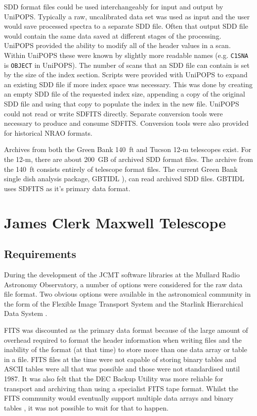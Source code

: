 \documentclass[final,authoryear,5p,times,twocolumn]{elsarticle}
\newcommand{\ascl}[1]{\href{http://www.ascl.net/#1}{ascl:#1}}
\begin{document}
SDD format files could be used interchangeably for input and output by
UniPOPS.  Typically a raw, uncalibrated data set was used as input and
the user would save processed spectra to a separate SDD file.  Often
that output SDD file would contain the same data saved at different
stages of the processing.  UniPOPS provided the ability to modify all
of the header values in a scan.  Within UniPOPS these were known by
slightly more readable names (e.g. \texttt{C1SNA} is \texttt{OBJECT}
in UniPOPS). The number of scans that an SDD file can contain is set
by the size of the index section.  Scripts were provided with UniPOPS
to expand an existing SDD file if more index space was necessary.
This was done by creating an empty SDD file of the requested index
size, appending a copy of the original SDD file and using that copy to
populate the index in the new file.  UniPOPS could not read or write
SDFITS directly. Separate conversion tools were necessary to produce
and consume SDFITS.  Conversion tools were also provided for
historical NRAO formats.

Archives from both the Green Bank 140\, ft and Tucson 12-m telescopes
exist.  For the 12-m, there are about 200\, GB of archived SDD format
files.  The archive from the 140\, ft consists entirely of telescope
format files.  The current Green Bank single dish analysis package,
GBTIDL \citep[][\ascl{1303.019}]{2006ASPC..351..512M}), can read
archived SDD files.  GBTIDL uses SDFITS as it's primary data format.

\section{James Clerk Maxwell Telescope}

\subsection{Requirements}

During the development of the JCMT software libraries at the Mullard
Radio Astronomy Observatory, a number of options were considered for
the raw data file format.  Two obvious options were available in the
astronomical community in the form of the Flexible Image Transport System
\citep[FITS;][]{1981A&AS...44..363W} and the Starlink Hierarchical
Data System \citep[HDS;][\ascl{1502.009}]{1982QJRAS..23..485D,2015HDS}.

FITS was discounted as the primary data format because of the large
amount of overhead required to format the header information when
writing files and the inability of the format (at that time) to store
more than one data array or table in a file. FITS files at the time
were not capable of storing binary tables and ASCII tables were all
that was possible \citep{1988A&AS...73..365H} and those were not
standardised until 1987. It was also felt that the DEC Backup Utility
was more reliable for transport and archiving than using a specialist
FITS tape format. Whilst the FITS community would eventually support
multiple data arrays \citep{1988A&AS...73..359G} and binary tables
\citep{1995A&AS..113..159C}, it was not possible to wait for that to
happen.
\end{document}
